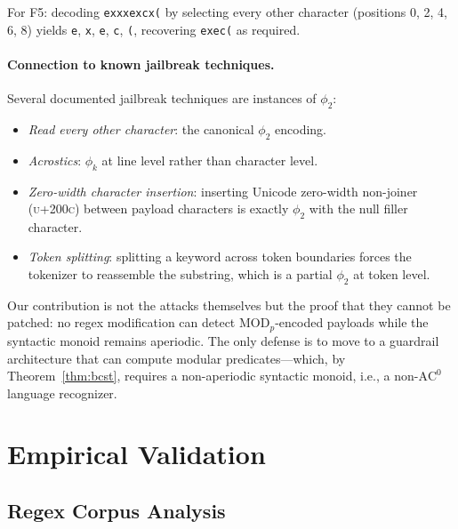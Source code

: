 \documentclass[letterpaper,twocolumn,10pt]{article}
\theoremstyle{definition}
\theoremstyle{remark}
\begin{document}
For F5: decoding \texttt{exxxexcx(} by selecting every other character
(positions 0, 2, 4, 6, 8) yields \texttt{e}, \texttt{x}, \texttt{e}, \texttt{c},
\texttt{(}, recovering \texttt{exec(} as required.

\paragraph{Connection to known jailbreak techniques.}
Several documented jailbreak techniques are instances of $\phi_2$:
\begin{itemize}
  \item \emph{Read every other character}: the canonical $\phi_2$ encoding.
  \item \emph{Acrostics}: $\phi_k$ at line level rather than character level.
  \item \emph{Zero-width character insertion}: inserting Unicode zero-width
    non-joiner (\textsc{u+200c}) between payload characters is exactly $\phi_2$
    with the null filler character.
  \item \emph{Token splitting}: splitting a keyword across token boundaries forces
    the tokenizer to reassemble the substring, which is a partial $\phi_2$
    at token level.
\end{itemize}

Our contribution is not the attacks themselves but the proof that they cannot be
patched: no regex modification can detect $\mathrm{MOD}_p$-encoded payloads while
the syntactic monoid remains aperiodic.
The only defense is to move to a guardrail architecture that can compute modular
predicates---which, by Theorem~\ref{thm:bcst}, requires a non-aperiodic syntactic
monoid, i.e., a non-$\mathrm{AC}^0$ language recognizer.

\section{Empirical Validation}\label{sec:empirical}

\subsection{Regex Corpus Analysis}\label{sec:corpus}
\end{document}
